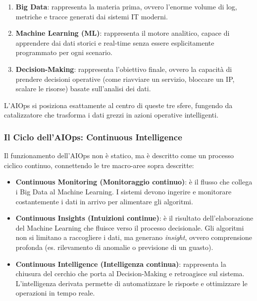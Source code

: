 \begin{enumerate}
    \item \textbf{Big Data}: rappresenta la materia prima, ovvero
    l'enorme volume di log, metriche e tracce generati dai sistemi IT
    moderni.
    \item \textbf{Machine Learning (ML)}: rappresenta il motore
    analitico, capace di apprendere dai dati storici e real-time senza
    essere esplicitamente programmato per ogni scenario.
    \item \textbf{Decision-Making}: rappresenta l'obiettivo finale,
    ovvero la capacità di prendere decisioni operative (come riavviare
    un servizio, bloccare un IP, scalare le risorse) basate sull'analisi
    dei dati.
\end{enumerate}

L'AIOps si posiziona esattamente al centro di queste tre sfere,
fungendo da catalizzatore che trasforma i dati grezzi in azioni
operative intelligenti.

\subsubsection{Il Ciclo dell'AIOps: Continuous Intelligence}

Il funzionamento dell'AIOps non è statico, ma è descritto come un
processo ciclico continuo, connettendo le tre macro-aree sopra
descritte:

\begin{itemize}
    \item \textbf{Continuous Monitoring (Monitoraggio continuo)}: è il
    flusso che collega i Big Data al Machine Learning. I sistemi devono
    ingerire e monitorare costantemente i dati in arrivo per alimentare
    gli algoritmi.
    \item \textbf{Continuous Insights (Intuizioni continue)}: è il
    risultato dell'elaborazione del Machine Learning che fluisce verso
    il processo decisionale. Gli algoritmi non si limitano a raccogliere
    i dati, ma generano \textit{insight}, ovvero comprensione profonda
    (es. rilevamento di anomalie o previsione di un guasto).
    \item \textbf{Continuous Intelligence (Intelligenza continua)}:
    rappresenta la chiusura del cerchio che porta al Decision-Making e
    retroagisce sul sistema. L'intelligenza derivata permette di
    automatizzare le risposte e ottimizzare le operazioni in tempo
    reale.
\end{itemize}

